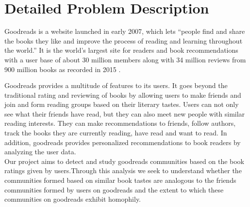 \documentclass[11pt]{article}
\begin{document}
\maketitle

\section{Detailed Problem Description}
Goodreads is a website launched in early 2007, which lets ``people find and share the books they like and improve the process of reading and learning throughout the world.'' It is the world's largest site for readers and book recommendations with a user base of about 30 million members along with 34 million reviews from 900 million books as recorded in 2015 \cite{goodreads:aboutus}.

Goodreads provides a multitude of features to its users. It goes beyond the traditional rating and reviewing of books by allowing users to make friends and join and form reading groups based on their literary tastes.
Users can not only see what their friends have read, but they can also meet new people with similar reading interests. They can make recommendations to friends, follow authors, track the books they are currently reading, have read and want to read. In addition, goodreads provides personalized recommendations to book readers by analyzing the user data.\\

Our project aims  to detect and study goodreads communities based on the book ratings given by users.Through this analysis we seek to understand whether the communities formed based on similar book tastes are analogous to the friends communities formed by users on goodreads and the extent to which these communities on goodreads exhibit homophily.
\end{document}
